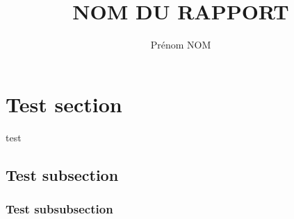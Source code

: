 \documentclass{ceri/sty/rapport}
\title{NOM DU RAPPORT}
\author{  
	Prénom NOM
}
\begin{document}
 
\maketitle



\section{Test section}
test
\subsection{Test subsection}
\subsubsection{Test subsubsection}















  
  
  
  
  
  
  
  
  
  
  
  
  

  
  
  
  
  
  
  
\end{document}
